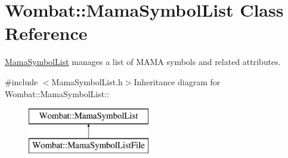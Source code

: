 \hypertarget{classWombat_1_1MamaSymbolList}{
\section{Wombat::MamaSymbolList Class Reference}
\label{classWombat_1_1MamaSymbolList}
}


\hyperlink{classWombat_1_1MamaSymbolList}{MamaSymbolList} manages a list of MAMA symbols and related attributes.  


{\ttfamily \#include $<$MamaSymbolList.h$>$}Inheritance diagram for Wombat::MamaSymbolList::\begin{figure}[H]
\begin{center}
\leavevmode
\includegraphics[height=2cm]{classWombat_1_1MamaSymbolList}
\end{center}
\end{figure}
